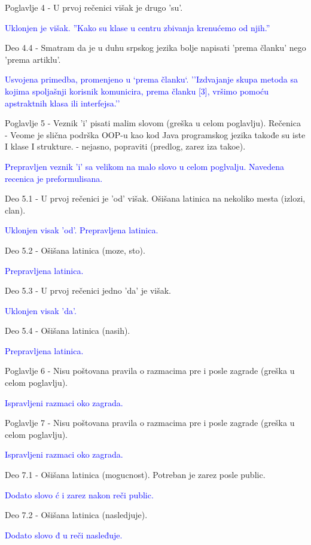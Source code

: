 \documentclass[a4paper]{report}
\newcommand{\odgovor}[1]{\textcolor{blue}{#1}}
\begin{document}
Poglavlje 4 - U prvoj re\v cenici vi\v sak je drugo 'su'.

\odgovor{
Uklonjen je višak. ''Kako su klase u centru zbivanja krenućemo od njih.''
}

Deo 4.4 - Smatram da je u duhu srpskog jezika bolje napisati 'prema \v clanku' nego 'prema artiklu'.

\odgovor{
Usvojena primedba, promenjeno u `prema članku`.  ''Izdvajanje skupa metoda sa kojima spoljašnji korisnik komunicira, prema članku [3], vršimo pomoću apstraktnih klasa ili interfejsa.''
}

Poglavlje 5 - Veznik 'i' pisati malim slovom (gre\v ska u celom poglavlju).
Re\v cenica - Veome je sli\v cna podr\v ska OOP-u kao kod Java programskog jezika takođe su iste I klase I strukture. - nejasno, popraviti (predlog, zarez iza tako\dj{}e).

\odgovor{
Prepravljen veznik 'i' sa velikom na malo slovo u celom poglvalju. Navedena recenica je preformulisana.
}

Deo 5.1 - U prvoj re\v cenici je 'od' vi\v sak. O\v si\v sana latinica na nekoliko mesta (izlozi, clan).

\odgovor{
Uklonjen visak 'od'. Prepravljena latinica.
}

Deo 5.2 - O\v si\v sana latinica (moze, sto).

\odgovor{
Prepravljena latinica.
}

Deo 5.3 - U prvoj re\v cenici jedno 'da' je vi\v sak.

\odgovor{
Uklonjen visak 'da'.
}

Deo 5.4 - O\v si\v sana latinica (nasih).

\odgovor{
Prepravljena latinica.
}

Poglavlje 6 - Nisu po\v stovana pravila o razmacima pre i posle zagrade (gre\v ska u celom poglavlju).

\odgovor{
Ispravljeni razmaci oko zagrada.
}

Poglavlje 7 - Nisu po\v stovana pravila o razmacima pre i posle zagrade (gre\v ska u celom poglavlju).

\odgovor{
Ispravljeni razmaci oko zagrada.
}

Deo 7.1 - O\v si\v sana latinica (mogucnost). Potreban je zarez posle public.

\odgovor{
Dodato slovo ć i zarez nakon reči public.
}

Deo 7.2 - O\v si\v sana latinica (nasledjuje).

\odgovor{
Dodato slovo đ u reči nasleđuje.
}
\end{document}

